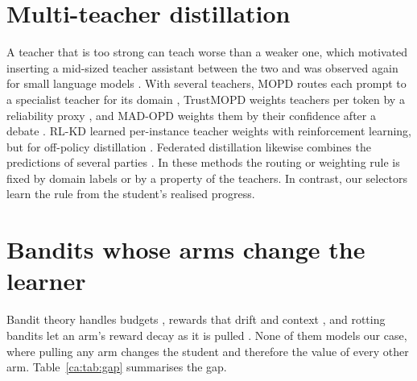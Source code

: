 \section{Multi-teacher distillation}

A teacher that is too strong can teach worse than a weaker one, which motivated inserting a
mid-sized teacher assistant between the two \autocite{mirzadeh_ta_2020} and was observed
again for small language models \autocite{li_learnability_gap_2025}. With several teachers,
MOPD routes each prompt to a specialist teacher for its domain \autocite{ma_mopd_2026},
TrustMOPD weights teachers per token by a reliability proxy
\autocite{sun_trustmopd_2026}, and MAD-OPD weights them by their confidence after a debate
\autocite{wang_madopd_2026}. RL-KD learned per-instance teacher weights with reinforcement
learning, but for off-policy distillation \autocite{yuan_rlkd_2021}. Federated distillation
likewise combines the predictions of several parties
\autocite{li_fedmd_2019,lin_feddf_2020,fan_fedmkt_2025}. In these methods the routing or
weighting rule is fixed by domain labels or by a property of the teachers. In contrast, our
selectors learn the rule from the student's realised progress.

\section{Bandits whose arms change the learner}

Bandit theory handles budgets \autocite{badanidiyuru_bwk_2013}, rewards that drift
\autocite{garivier_ducb_2011} and context \autocite{li_linucb_2010}, and rotting bandits let
an arm's reward decay as it is pulled \autocite{levine_rotting_2017}. None of them models
our case, where pulling any arm changes the student and therefore the value of every other
arm. Table~\ref{ca:tab:gap} summarises the gap.

